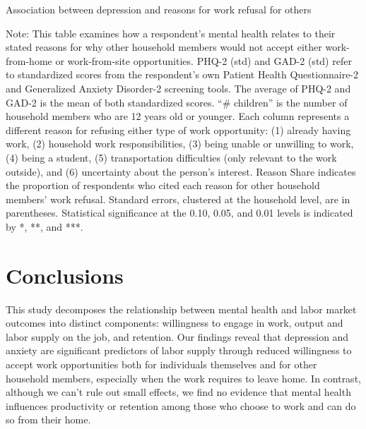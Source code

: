 \documentclass[12pt, a4paper, american]{article}
\begin{document}
\begin{table}[H]\caption{Association between depression and reasons for work refusal for others}\label{cor_mh_signup_reasons_others}
\centering
\begin{adjustbox}{width=\textwidth}
\begin{threeparttable}

\begin{tablenotes}
\item Note: This table examines how a respondent's mental health relates to their stated reasons for why other household members would not accept either work-from-home or work-from-site opportunities. PHQ-2 (std) and GAD-2 (std) refer to standardized scores from the respondent's own Patient Health Questionnaire-2 and Generalized Anxiety Disorder-2 screening tools. The average of PHQ-2 and GAD-2 is the mean of both standardized scores. ``\# children'' is the number of household members who are 12 years old or younger. Each column represents a different reason for refusing either type of work opportunity: (1) already having work, (2) household work responsibilities, (3) being unable or unwilling to work, (4) being a student, (5) transportation difficulties (only relevant to the work outside), and (6) uncertainty about the person's interest. Reason Share indicates the proportion of respondents who cited each reason for other household members' work refusal.  Standard errors, clustered at the household level, are in parentheses. Statistical significance at the 0.10, 0.05, and 0.01 levels is indicated by *, **, and ***. 
\end{tablenotes}
\end{threeparttable}
\end{adjustbox}
\end{table}


\section{Conclusions}\label{sec_conclusion}

This study decomposes the relationship between mental health and labor market outcomes into distinct components: willingness to engage in work, output and labor supply on the job, and retention. Our findings reveal that depression and anxiety are significant predictors of labor supply through reduced willingness to accept work opportunities both for individuals themselves and for other household members, especially when the work requires to leave home. In contrast, although we can't rule out small effects, we find no evidence that mental health influences productivity or retention among those who choose to work and can do so from their home. 
\end{document}

